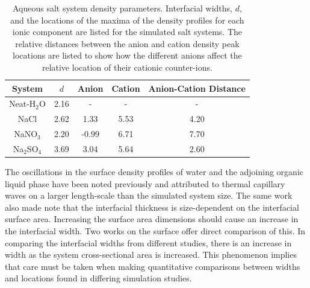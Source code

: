 \begin{table}[htdp]
	\begin{center}
	\begin{tabular}{|c||c|c|c|c|}
		\hline
		System & $d$ & Anion & Cation & Anion-Cation Distance \\ \hline
		Neat-H$_2$O & 2.16 & - & - & - \\ 
		NaCl & 2.62 & 1.33 & 5.53 & 4.20 \\
		NaNO$_3$ & 2.20 & -0.99 & 6.71 & 7.70 \\
		Na$_2$SO$_4$ & 3.69 & 3.04 & 5.64 & 2.60 \\
		\hline
	\end{tabular}
	\end{center}
	\caption{Aqueous salt system density parameters. Interfacial widths, $d$, and the locations of the maxima of the density profiles for each ionic component are listed for the simulated salt systems. The relative distances between the anion and cation density peak locations are listed to show how the different anions affect the relative location of their cationic counter-ions.}
	\label{table:double-layer}
\end{table}

The oscillations in the surface density profiles of water and the adjoining organic \ctc liquid phase have been noted previously and attributed to thermal capillary waves on a larger length-scale than the simulated system size.\cite{Chang1996} The same work also made note that the interfacial thickness is size-dependent on the interfacial surface area. Increasing the surface area dimensions should cause an increase in the interfacial width. Two works on the \ctcwat surface offer direct comparison of this.\cite{Chang1996,Hore2008} In comparing the interfacial widths from different studies, there is an increase in width as the system cross-sectional area is increased. This phenomenon implies that care must be taken when making quantitative comparisons between widths and locations found in differing simulation studies.

